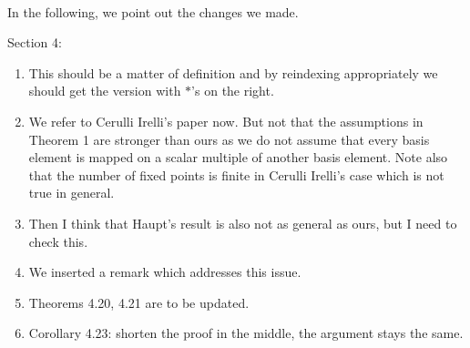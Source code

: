 \documentclass[titlepage,11pt,a4paper]{{scrartcl}}
\begin{document}
\pagestyle{empty}


\\



\noindent In the following, we point out the changes we made.

Section 4:
\begin{enumerate}
\renewcommand{\labelenumi}{(\arabic{enumi})}
\item This should be a matter of definition and by reindexing appropriately we should get the version with $\ast$'s on the right.
\item We refer to Cerulli Irelli's paper now. But not that the assumptions in Theorem 1 are stronger than ours as we do not assume that every basis element is mapped on a scalar multiple of another basis element. Note also that the number of fixed points is finite in Cerulli Irelli's case which is not true in general.
\item Then I think that Haupt's result is also not as general as ours, but I need to check this.
\item We inserted a remark which addresses this issue.
\item Theorems 4.20, 4.21 are to be updated.
\item Corollary 4.23: shorten the proof in the middle, the argument stays the same.
\end{enumerate}
\end{document}
